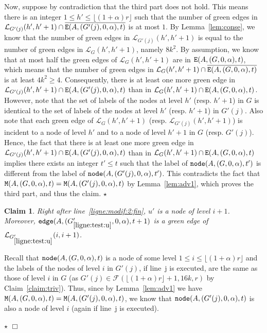 \documentclass[11pt]{article}
\newtheorem{claim}{Claim}[section]
\newcommand{\qed}{\hfill $\Box$ \bigbreak}
\newenvironment{proof}{\noindent {\bf Proof.}}{\qed}
\newenvironment{proofclaim}{\noindent{\bf Proof of the claim.}}{\hfill$\star$}
\begin{document}
{\begin{proof}
\begin{proofclaim}
Now, suppose by contradiction that the third part does not hold. This means there is an integer $1\leq h'\leq\lfloor(1+\alpha)r\rfloor$ such that the number of green edges in $\mathcal{L}_{G'(j)}(h',h'+1)\cap\overline{{\tt E}(A,(G'(j),0,\alpha),t)}$ is at most $1$. By Lemma~\ref{lem:conse}, we know that the number of green edges in
  $\mathcal{L}_{G'(j)}(h',h'+1)$ is equal to the number of green edges in $\mathcal{L}_{G}(h',h'+1)$, namely $8k^2$. By assumption, we know that at most half the green edges of $\mathcal{L}_{G}(h',h'+1)$ are in ${\tt E}(A,(G,0,\alpha),t)$, which means that the number of green edges in $\mathcal{L}_{G}(h',h'+1)\cap\overline{{\tt E}(A,(G,0,\alpha),t)}$ is at least $4k^2\geq 4$. Consequently, there is at least one more green edge in $\mathcal{L}_{G'(j)}(h',h'+1)\cap{\tt
    E}(A,(G'(j),0,\alpha),t)$ than in
  $\mathcal{L}_{G}(h',h'+1)\cap{\tt
    E}(A,(G,0,\alpha),t)$. However, note that
  the set of labels of the nodes at level $h'$ (resp. $h'+1$) in
  $G$ is identical to the set of labels of the nodes at level
  $h'$ (resp. $h'+1$) in $G'(j)$. Also note that each green edge of
  $\mathcal{L}_{G}(h',h'+1)$
  (resp. $\mathcal{L}_{G'(j)}(h',h'+1)$) is incident to a node of
  level $h'$ and to a node of level $h'+1$ in $G$
  (resp. $G'(j)$). Hence, the fact that there is at least one more
  green edge in $\mathcal{L}_{G'(j)}(h',h'+1)\cap{\tt
    E}(A,(G'(j),0,\alpha),t)$  than in
   $\mathcal{L}_{G}(h',h'+1)\cap{\tt
    E}(A,(G,0,\alpha),t)$ implies
  there exists an integer $t'\leq t$ such that the label of ${\tt
    node}(A,(G,0,\alpha),t')$ is different from the label of
  ${\tt node}(A,(G'(j),0,\alpha),t')$. This contradicts the fact
  that ${\tt M}(A,(G,0,\alpha),t)={\tt
    M}(A,(G'(j),0,\alpha),t)$ by Lemma~\ref{lem:adv1}, which
  proves the third part, and thus the claim.
\end{proofclaim}

\begin{claim}\label{claim:green_edge}
Right after line~\ref{ligne:modif:2:fin}, $u'$ is a node of level $i+1$. Moreover, ${\tt edge}(A,(G'_{\ref{ligne:test:u}},0,\alpha),t+1)$ is a green edge of $\mathcal{L}_{G'_{\ref{ligne:test:u}}}(i,i+1)$.
\end{claim}

\begin{proofclaim}
Recall that ${\tt node}(A,(G,0,\alpha),t)$ is a node of some level $1\leq i\leq\lfloor(1+\alpha)r\rfloor$ and the labels of the nodes of level $i$ in $G'(j)$, if line~j is executed, are the same as those of level $i$ in $G$ (as $G'(j)\in\mathcal{F}(\lfloor(1+\alpha)r\rfloor+1,16k,r)$ by Claim~\ref{claim:triv}). Thus, since by Lemma~\ref{lem:adv1} we have ${\tt M}(A,(G,0,\alpha),t)={\tt M}(A,(G'(j),0,\alpha),t)$, we know that ${\tt node}(A,(G'(j),0,\alpha),t)$ is also a node of level $i$ (again if line~j is executed).


\end{proofclaim}
\end{proof}}
\end{document}
